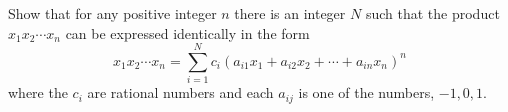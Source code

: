 Show that for any positive integer $n$ there is an integer $N$ such that the product $x_1x_2\cdots x_n$ can be expressed identically in the form
\[x_1x_2\cdots x_n=\sum_{i=1}^Nc_i(a_{i1}x_1+a_{i2}x_2+\cdots +a_{in}x_n)^n\]
where the $c_i$ are rational numbers and each $a_{ij}$ is one of the numbers, $-1,0,1.$